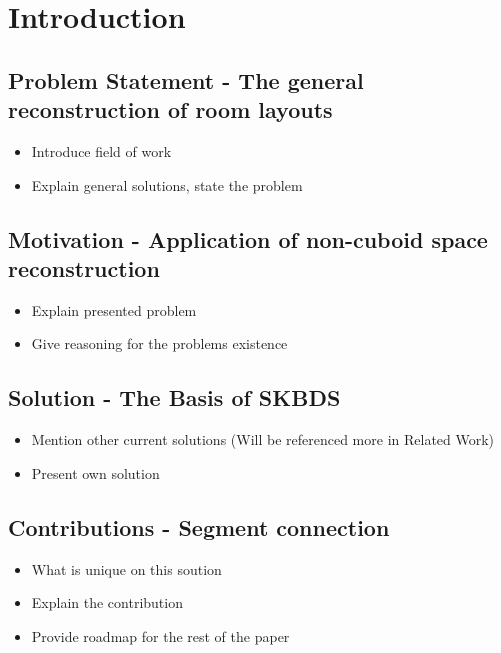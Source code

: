 \section{Introduction}

\subsection{Problem Statement - The general reconstruction of room layouts}
\begin{itemize}
    \item Introduce field of work
    \item Explain general solutions, state the problem
\end{itemize}


\subsection{Motivation - Application of non-cuboid space reconstruction}
\begin{itemize}
    \item Explain presented problem
    \item Give reasoning for the problems existence 
\end{itemize}


\subsection{Solution - The Basis of SKBDS}
\begin{itemize}
    \item Mention other current solutions (Will be referenced more in Related Work)
    \item Present own solution
\end{itemize}


\subsection{Contributions - Segment connection}
\begin{itemize}
    \item What is unique on this soution
    \item Explain the contribution
    \item Provide roadmap for the rest of the paper
\end{itemize}


